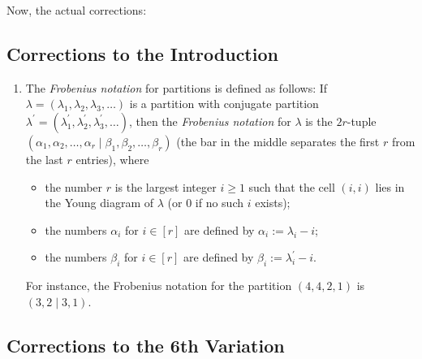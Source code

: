 \documentclass[numbers=enddot,12pt,final,onecolumn,notitlepage]{scrartcl}%
\theoremstyle{definition}
\begin{document}
Now, the actual corrections:

\subsection{Corrections to the Introduction}

\begin{enumerate}
\item The \emph{Frobenius notation} for partitions is defined as follows: If
$\lambda=\left(  \lambda_{1},\lambda_{2},\lambda_{3},\ldots\right)  $ is a
partition with conjugate partition $\lambda^{\prime}=\left(  \lambda
_{1}^{\prime},\lambda_{2}^{\prime},\lambda_{3}^{\prime},\ldots\right)  $, then
the \emph{Frobenius notation} for $\lambda$ is the $2r$-tuple $\left(
\alpha_{1},\alpha_{2},\ldots,\alpha_{r}\mid\beta_{1},\beta_{2},\ldots
,\beta_{r}\right)  $ (the bar in the middle separates the first $r$ from the
last $r$ entries), where

\begin{itemize}
\item the number $r$ is the largest integer $i\geq1$ such that the cell
$\left(  i,i\right)  $ lies in the Young diagram of $\lambda$ (or $0$ if no
such $i$ exists);

\item the numbers $\alpha_{i}$ for $i\in\left[  r\right]  $ are defined by
$\alpha_{i}:=\lambda_{i}-i$;

\item the numbers $\beta_{i}$ for $i\in\left[  r\right]  $ are defined by
$\beta_{i}:=\lambda_{i}^{\prime}-i$.
\end{itemize}

For instance, the Frobenius notation for the partition $\left(
4,4,2,1\right)  $ is $\left(  3,2\mid3,1\right)  $.
\end{enumerate}

\subsection{Corrections to the 6th Variation}
\end{document}
